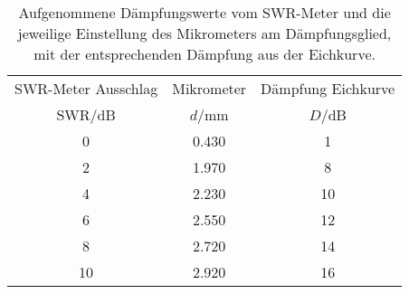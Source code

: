 \begin{table}[!h]
	\centering
	\begin{tabular}{ccc}
		\toprule
		SWR-Meter Ausschlag & Mikrometer & Dämpfung Eichkurve\\
		$\mathrm{SWR}$/\si{dB} & $d$/\si{mm} & $D$/\si{dB}\\
\midrule
		\num{0} & \num{0.430} & \num{1}\\
		\num{2} & \num{1.970} & \num{8}\\
		\num{4} & \num{2.230} & \num{10}\\
		\num{6} & \num{2.550} & \num{12}\\
		\num{8} & \num{2.720} & \num{14}\\
		\num{10} & \num{2.920} & \num{16}\\
		\bottomrule
	\end{tabular}
	\caption{Aufgenommene Dämpfungswerte vom SWR-Meter und die jeweilige Einstellung
                des Mikrometers am Dämpfungsglied, mit der entsprechenden Dämpfung aus der Eichkurve. \label{tab:Daempfung}}
\end{table}
